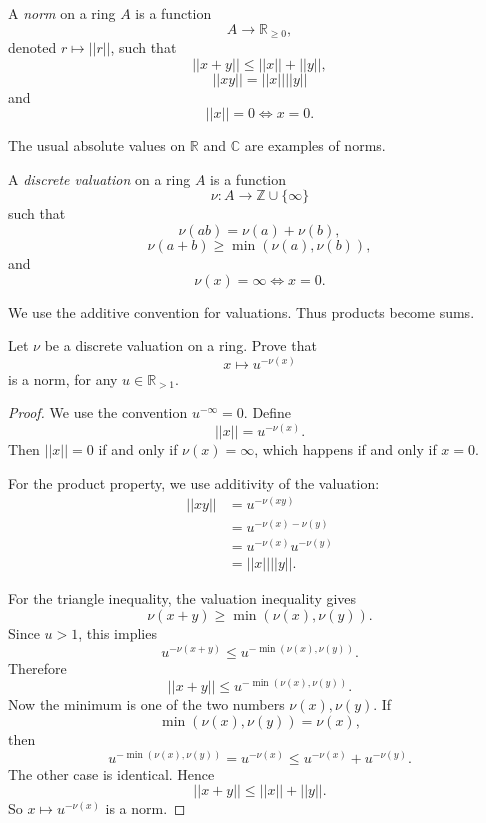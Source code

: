\begin{definition}
\label{definition-norm-on-ring}
A {\it norm} on a ring $A$ is a
function
$$
A \to \mathbb R_{\geq 0},
$$
denoted $r \mapsto ||r||$, such that
$$
||x+y|| \leq ||x||+||y||,
$$
$$
||xy||=||x||||y||
$$
and
$$
||x||=0 \Leftrightarrow x=0.
$$
\end{definition}

\begin{remark}
\label{remark-usual-absolute-value-norm}
The usual absolute values on
$\mathbb R$ and $\mathbb C$ are
examples of norms.
\end{remark}

\begin{definition}
\label{definition-discrete-valuation-duplicate-2}
A {\it discrete valuation} on a ring
$A$ is a function
$$
\nu:A \to \mathbb Z \cup \{\infty\}
$$
such that
$$
\nu(ab)=\nu(a)+\nu(b),
$$
$$
\nu(a+b)\geq \min(\nu(a),\nu(b)),
$$
and
$$
\nu(x)=\infty \Leftrightarrow x=0.
$$
\end{definition}

\begin{remark}
\label{remark-additive-valuation-convention}
We use the additive convention for
valuations. Thus products become sums.
\end{remark}

\begin{exercise}
\label{exercise-norm-from-discrete-valuation}
Let $\nu$ be a discrete valuation on
a ring. Prove that
$$
x \mapsto u^{-\nu(x)}
$$
is a norm, for any
$u \in \mathbb R_{>1}$.
\end{exercise}

\begin{proof}
We use the convention $u^{-\infty}=0$.
Define
$$
||x||=u^{-\nu(x)}.
$$
Then $||x||=0$ if and only if
$\nu(x)=\infty$, which happens if and
only if $x=0$.

For the product property, we use
additivity of the valuation:
$$
\begin{aligned}
||xy||
&=u^{-\nu(xy)}\\
&=u^{-\nu(x)-\nu(y)}\\
&=u^{-\nu(x)}u^{-\nu(y)}\\
&=||x||||y||.
\end{aligned}
$$

For the triangle inequality, the
valuation inequality gives
$$
\nu(x+y)\geq \min(\nu(x),\nu(y)).
$$
Since $u>1$, this implies
$$
u^{-\nu(x+y)}
\leq
u^{-\min(\nu(x),\nu(y))}.
$$
Therefore
$$
||x+y||
\leq
u^{-\min(\nu(x),\nu(y))}.
$$
Now the minimum is one of the two
numbers $\nu(x),\nu(y)$. If
$$
\min(\nu(x),\nu(y))=\nu(x),
$$
then
$$
u^{-\min(\nu(x),\nu(y))}
=
u^{-\nu(x)}
\leq
u^{-\nu(x)}+u^{-\nu(y)}.
$$
The other case is identical. Hence
$$
||x+y|| \leq ||x||+||y||.
$$
So $x \mapsto u^{-\nu(x)}$ is a norm.
\end{proof}

